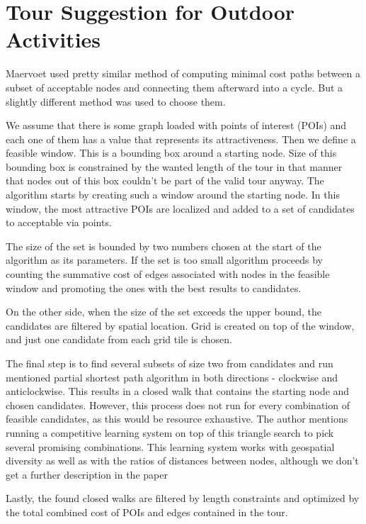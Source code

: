 \documentclass{ctuthesis}
\begin{document}
\section{Tour Suggestion for Outdoor Activities}
Maervoet \cite{oatsp}used pretty similar method of computing minimal cost paths between a subset of acceptable nodes and connecting them afterward into a cycle. But a slightly different method was used to choose them. \par 
We assume that there is some graph loaded with points of interest (POIs) and each one of them has a value that represents its attractiveness. Then we define a feasible window. This is a bounding box around a starting node. Size of this bounding box is constrained by the wanted length of the tour in that manner that nodes out of this box couldn't be part of the valid tour anyway. The algorithm starts by creating such a window around the starting node. In this window, the most attractive POIs are localized and added to a set of candidates to acceptable via points. \par
The size of the set is bounded by two numbers chosen at the start of the algorithm as its parameters. If the set is too small algorithm proceeds by counting the summative cost of edges associated with nodes in the feasible window and promoting the ones with the best results to candidates.\par
On the other side, when the size of the set exceeds the upper bound, the candidates are filtered by spatial location. Grid is created on top of the window, and just one candidate from each grid tile is chosen. \par
The final step is to find several subsets of size two from candidates and run mentioned partial shortest path algorithm in both directions - clockwise and anticlockwise. This results in a closed walk that contains the starting node and chosen candidates. However, this process does not run for every combination of feasible candidates, as this would be resource exhaustive. The author mentions running a competitive learning system on top of this triangle search to pick several promising combinations. This learning system works with geospatial diversity as well as with the ratios of distances between nodes, although we don't get a further description in the paper \par 
Lastly, the found closed walks are filtered by length constraints and optimized by the total combined cost of POIs and edges contained in the tour. \par 
\end{document}

